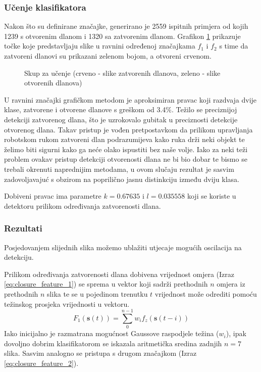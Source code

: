 \documentclass[times, utf8, diplomski, numeric]{fer}
\begin{document}
\subsubsection{Učenje klasifikatora}
Nakon što su definirane značajke, generirano je 2559 ispitnih primjera od kojih 1239 s otvorenim dlanom i 1320 sa zatvorenim dlanom. Grafikon \ref{scatter_me} prikazuje točke koje predstavljaju slike u ravnini određenoj značajkama $f_{1}$ i $f_{2}$ s time da zatvoreni dlanovi su prikazani zelenom bojom, a otvoreni crvenom.

\begin{figure}[h!]

\centering

\renewcommand{\figurename}{Grafikon}
	\caption{Skup za učenje (crveno - slike zatvorenih dlanova, zeleno - slike otvorenih dlanova)}
\label{scatter_me}
\end{figure}

U ravnini značajki grafičkom metodom je aproksimiran pravac koji razdvaja dvije klase, zatvorene i otvorene dlanove s greškom od 3.4\%. Težilo se preciznijoj detekciji zatvorenog dlana, što je uzrokovalo gubitak u preciznosti detekcije otvorenog dlana. Takav pristup je vođen pretpostavkom da prilikom upravljanja robotskom rukom zatvoreni dlan podrazumijeva kako ruka drži neki objekt te želimo biti sigurni kako ga neće olako ispustiti bez naše volje. Iako za neki teži problem ovakav pristup detekciji otvorenosti dlana ne bi bio dobar te bismo se trebali okrenuti naprednijim metodama, u ovom slučaju rezultat je sasvim zadovoljavajuć s obzirom na poprilično jasnu distinkciju između dviju klasa.

Dobiveni pravac ima parametre $k = 0.67635$ i $l=0.035558$ koji se koriste u detektoru prilikom određivanja zatvorenosti dlana.

\subsubsection{Rezultati}
\label{sec:tuning}
Posjedovanjem slijednih slika možemo ublažiti utjecaje mogućih oscilacija na detekciju.

Prilikom određivanja zatvorenosti dlana dobivena vrijednost omjera (Izraz \ref{eq:closure_feature_1}) se sprema u vektor koji sadrži prethodnih $ n $  omjera iz prethodnih $n$ slika te se u pojedinom trenutku $t$ vrijednost može odrediti pomoću težinskog prosjeka vrijednosti u vektoru.
\begin{equation}\label{eq:advanced_closure_feature}
F_{1}(\mathbf{s}(t))=\sum_{0}^{n-1} w_{i}f_{z}(\mathbf{s}(t-i))
\end{equation}
Iako inicijalno je razmatrana mogućnost Gaussove raspodjele težina ($w_{i}$), ipak dovoljno dobrim klasifikatorom se iskazala aritmetička sredina zadnjih $n=7$ slika. Sasvim analogno se pristupa s drugom značajkom (Izraz \ref{eq:closure_feature_2}).
\end{document}

